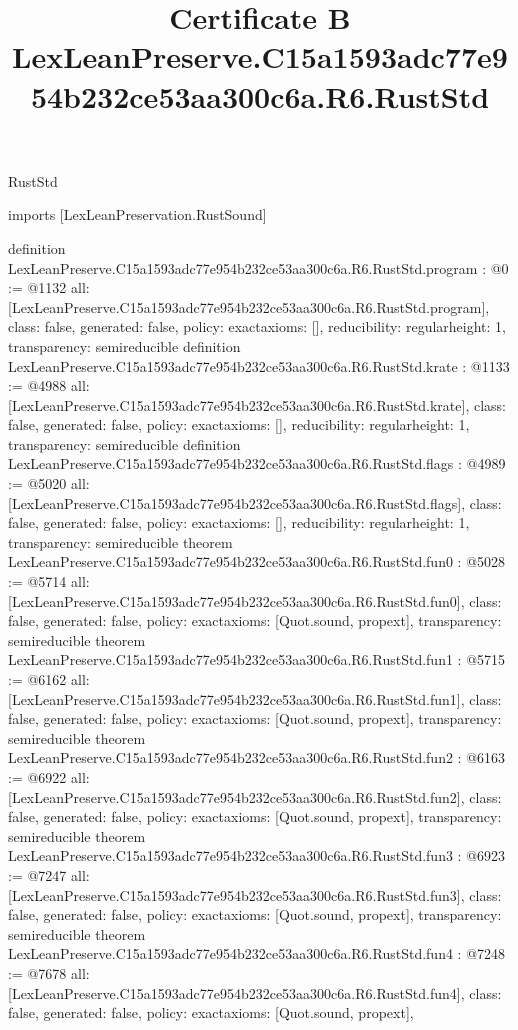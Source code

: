 \begin{lexlean}{RustStd}
\title{Certificate B LexLeanPreserve.C15a1593adc77e954b232ce53aa300c6a.R6.RustStd}
\begin{coremodule}
imports [LexLeanPreservation.RustSound]

definition LexLeanPreserve.C15a1593adc77e954b232ce53aa300c6a.R6.RustStd.program : @0 := @1132 {
  all: [LexLeanPreserve.C15a1593adc77e954b232ce53aa300c6a.R6.RustStd.program],
  class: false,
  generated: false,
  policy: exact{axioms: []},
  reducibility: regular{height: 1},
  transparency: semireducible
}
definition LexLeanPreserve.C15a1593adc77e954b232ce53aa300c6a.R6.RustStd.krate : @1133 := @4988 {
  all: [LexLeanPreserve.C15a1593adc77e954b232ce53aa300c6a.R6.RustStd.krate],
  class: false,
  generated: false,
  policy: exact{axioms: []},
  reducibility: regular{height: 1},
  transparency: semireducible
}
definition LexLeanPreserve.C15a1593adc77e954b232ce53aa300c6a.R6.RustStd.flags : @4989 := @5020 {
  all: [LexLeanPreserve.C15a1593adc77e954b232ce53aa300c6a.R6.RustStd.flags],
  class: false,
  generated: false,
  policy: exact{axioms: []},
  reducibility: regular{height: 1},
  transparency: semireducible
}
theorem LexLeanPreserve.C15a1593adc77e954b232ce53aa300c6a.R6.RustStd.fun0 : @5028 := @5714 {
  all: [LexLeanPreserve.C15a1593adc77e954b232ce53aa300c6a.R6.RustStd.fun0],
  class: false,
  generated: false,
  policy: exact{axioms: [Quot.sound, propext]},
  transparency: semireducible
}
theorem LexLeanPreserve.C15a1593adc77e954b232ce53aa300c6a.R6.RustStd.fun1 : @5715 := @6162 {
  all: [LexLeanPreserve.C15a1593adc77e954b232ce53aa300c6a.R6.RustStd.fun1],
  class: false,
  generated: false,
  policy: exact{axioms: [Quot.sound, propext]},
  transparency: semireducible
}
theorem LexLeanPreserve.C15a1593adc77e954b232ce53aa300c6a.R6.RustStd.fun2 : @6163 := @6922 {
  all: [LexLeanPreserve.C15a1593adc77e954b232ce53aa300c6a.R6.RustStd.fun2],
  class: false,
  generated: false,
  policy: exact{axioms: [Quot.sound, propext]},
  transparency: semireducible
}
theorem LexLeanPreserve.C15a1593adc77e954b232ce53aa300c6a.R6.RustStd.fun3 : @6923 := @7247 {
  all: [LexLeanPreserve.C15a1593adc77e954b232ce53aa300c6a.R6.RustStd.fun3],
  class: false,
  generated: false,
  policy: exact{axioms: [Quot.sound, propext]},
  transparency: semireducible
}
theorem LexLeanPreserve.C15a1593adc77e954b232ce53aa300c6a.R6.RustStd.fun4 : @7248 := @7678 {
  all: [LexLeanPreserve.C15a1593adc77e954b232ce53aa300c6a.R6.RustStd.fun4],
  class: false,
  generated: false,
  policy: exact{axioms: [Quot.sound, propext]},
}
\end{coremodule}
\end{lexlean}
